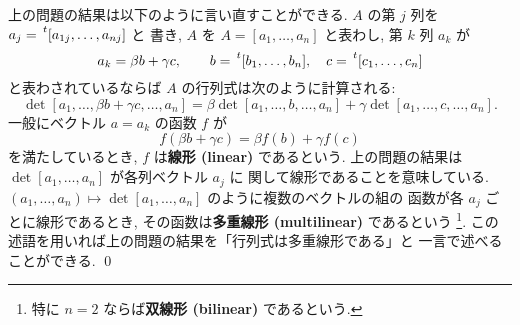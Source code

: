\documentclass[12pt,twoside]{jarticle}
\begin{document}
\begin{guide}
  上の問題の結果は以下のように言い直すことができる.
  $A$ の第 $j$ 列を $a_j=\tp{[a_{1j},\ldots,a_{nj}]}$ と
  書き, $A$ を $A=[a_1,\ldots,a_n]$ と表わし, 第 $k$ 列 $a_k$ が
  \begin{equation*}
    a_k = \beta b + \gamma c,
    \qquad
    b = \tp{[b_1,\ldots,b_n]}, \quad
    c = \tp{[c_1,\ldots,c_n]}
  \end{equation*}
  と表わされているならば $A$ の行列式は次のように計算される:
  \begin{equation*}
    \det[a_1,\ldots,\beta b + \gamma c,\ldots,a_n]
    = \beta \det[a_1,\ldots, b,\ldots,a_n]
    + \gamma\det[a_1,\ldots, c,\ldots,a_n].
  \end{equation*}
  一般にベクトル $a=a_k$ の函数 $f$ が
  \begin{equation*}
    f(\beta b+\gamma c) = \beta f(b) + \gamma f(c)
  \end{equation*}
  を満たしているとき, $f$ は{\bf 線形 (linear)} であるという.
  上の問題の結果は $\det[a_1,\ldots,a_n]$ が各列ベクトル $a_j$ に
  関して線形であることを意味している.
  $(a_1,\ldots,a_n)\mapsto\det[a_1,\ldots,a_n]$ のように複数のベクトルの組の
  函数が各 $a_j$ ごとに線形であるとき, その函数は{\bf 多重線形 (multilinear)} 
  であるという%
  \footnote{特に $n=2$ ならば{\bf 双線形 (bilinear)} であるという.}.
  この述語を用いれば上の問題の結果を「行列式は多重線形である」と
  一言で述べることができる. 
  \qed
\end{guide}

\end{document}
